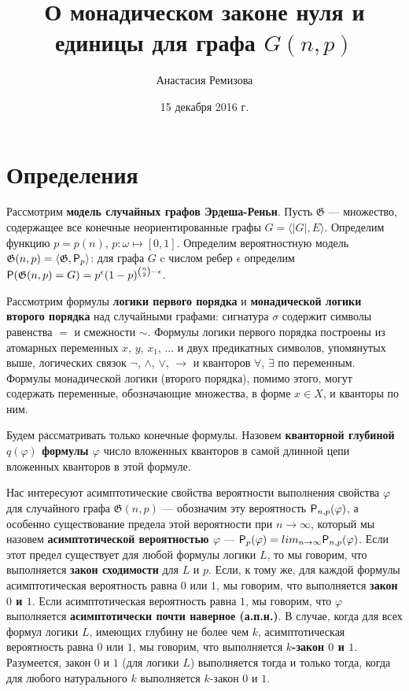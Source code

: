 \documentclass{article}
\title{О монадическом законе нуля и единицы для графа $G(n, p)$}
\author{Анастасия Ремизова}
\date{15 декабря 2016 г.}
\begin{document}
\maketitle

\section{Определения}

Рассмотрим {\bf модель случайных графов Эрдеша-Реньи}. Пусть $\mathfrak{G}$ --- множество, содержащее все конечные неориентированные графы $G = \langle |G|, E\rangle$. Определим функцию $p= p(n)$, $p: \omega \mapsto [0, 1]$. Определим вероятностную модель  $\mathfrak{G}(n, p) = \langle \mathfrak{G}, {\sf P}_p \rangle$: для графа $G$ c числом ребер $\epsilon$ определим ${\sf P}(\mathfrak{G}(n, p) = G) = p^{\epsilon}(1-p)^{{n \choose 2} - \epsilon}$.

Рассмотрим формулы {\bf логики первого порядка} и {\bf монадической логики второго порядка} над случайными графами: сигнатура $\sigma$ содержит символы равенства $=$ и смежности $\sim$. Формулы логики первого порядка построены из атомарных переменных $x$, $y$, $x_1$, ... и двух предикатных символов, упомянутых выше, логических связок $\neg$, $\land$, $\lor$, $\rightarrow$ и кванторов $\forall$, $\exists$ по переменным. Формулы монадической логики (второго порядка), помимо этого, могут содержать переменные, обозначающие множества, в форме $x \in X$, и кванторы по ним.

Будем рассматривать только конечные формулы. Назовем {\bf кванторной глубиной $q(\varphi)$ формулы $\varphi$} число вложенных кванторов в самой длинной цепи вложенных кванторов в этой формуле.

Нас интересуют асимптотические свойства вероятности выполнения свойства $\varphi$ для случайного графа $\mathfrak{G}(n, p)$ --- обозначим эту вероятность ${\sf P}_{n, p}(\varphi)$, а особенно существование предела этой вероятности при $n \rightarrow \infty$, который мы назовем {\bf асимптотической вероятностью $\varphi$} --- ${\sf P}_{p} (\varphi) = lim_{n \rightarrow \infty} {\sf P}_{n, p} (\varphi)$. Если этот предел существует для любой формулы логики $L$, то мы говорим, что выполняется {\bf закон сходимости} для $L$ и $p$. Если, к тому же, для каждой формулы асимптотическая вероятность равна $0$ или $1$, мы говорим, что выполняется {\bf закон $0$ и $1$}. Если асимптотическая вероятность равна $1$, мы говорим, что $\varphi$ выполняется {\bf асимптотически почти наверное (а.п.н.)}. В случае, когда для всех формул логики $L$, имеющих глубину не более чем $k$, асимптотическая вероятность равна $0$ или $1$, мы говорим, что выполняется {\bf $k$-закон $0$ и $1$}. Разумеется, закон $0$ и $1$ (для логики $L$) выполняется тогда и только тогда, когда для любого натурального $k$ выполняется $k$-закон $0$ и $1$.
\end{document}

